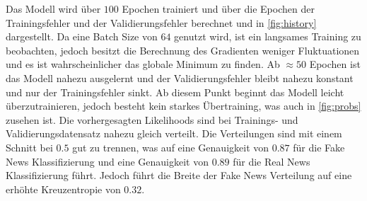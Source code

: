 Das Modell wird über $100$ Epochen trainiert und über die Epochen der Trainingsfehler und der Validierungsfehler 
berechnet und in \ref{fig:history} dargestellt. 
Da eine Batch Size von $64$ genutzt wird, ist ein langsames Training zu beobachten, jedoch besitzt die Berechnung 
des Gradienten weniger Fluktuationen und es ist wahrscheinlicher das globale Minimum zu finden. 
Ab $\approx 50$ Epochen ist das Modell nahezu ausgelernt und der Validierungsfehler bleibt nahezu konstant und 
nur der Trainingsfehler sinkt. 
Ab diesem Punkt beginnt das Modell leicht überzutrainieren, jedoch besteht kein starkes Übertraining, was auch in 
\ref{fig:probs} zusehen ist.
Die vorhergesagten Likelihoods sind bei Trainings- und Validierungsdatensatz nahezu gleich verteilt.
Die Verteilungen sind mit einem Schnitt bei $0.5$ gut zu trennen, was auf eine Genauigkeit von $0.87$ für die 
Fake News Klassifizierung und eine Genauigkeit von $0.89$ für die Real News Klassifizierung führt.
Jedoch führt die Breite der Fake News Verteilung auf eine erhöhte Kreuzentropie von $0.32$.

